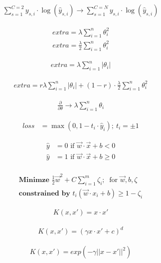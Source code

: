 \documentclass[USenglish,final,authoryear,12pt]{article}
\begin{document}
\begin{align*}
	\sum_{s=1}^{C=2}y_{s,i}\cdot\log(\hat{y}_{s,i}) \to \sum_{s=1}^{C=N}y_{s,i}\cdot\log(\hat{y}_{s,i})
\end{align*}

\begin{align*}
	extra=\lambda \sum_{i=1}^{n}\theta_i^2
\end{align*}
\begin{align*}
	extra=\frac{\lambda }{2}\sum_{i=1}^{n}\theta_i^2
\end{align*}

\begin{align*}
extra=\lambda\sum_{i=1}^{n}|\theta_i|
\end{align*}

\begin{align*}
	extra=r\lambda\sum_{i=1}^{n}|\theta_i|+(1-r)\cdot\frac{\lambda }{2}\sum_{i=1}^{n}\theta_i^2
\end{align*}

\begin{align*}
\frac{\partial}{\partial \theta} \to \lambda \sum_{i=1}^{n}\theta_i
\end{align*}

\begin{align*}
	loss &= \max(0, 1 - t_i\cdot \hat{y}_i);~ t_i = \pm 1
\end{align*}

\begin{align*}
	\hat{y} &= 0 \text{ if } \vec{w}\cdot\vec{x} + b < 0\\
	\hat{y} &= 1 \text{ if } \vec{w}\cdot\vec{x} + b \geq 0\\	
\end{align*}

\begin{align*}
	\textbf{Minimze } \frac{1}{2}\vec{w}^2 + C\sum_{i=1}^{m}\zeta_i;~\text{ for }\vec{w}, b, \zeta\\
	\textbf{constrained by } t_i(\vec{w}\cdot x_i + b)\geq 1-\zeta_i
\end{align*}

\begin{align*}
	K(x, x') = x\cdot x'
\end{align*}

\begin{align*}
	K(x, x') = \left(\gamma x\cdot x' + c \right)^d
\end{align*}

\begin{align*}
	K(x, x') = exp(-\gamma ||x - x'||^2)
\end{align*}
\end{document}
